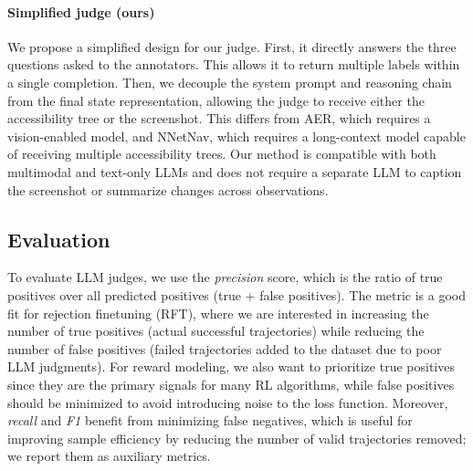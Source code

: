 \documentclass{article} %
\begin{document}
\paragraph{Simplified judge (ours)}
\label{sec:multi_reward_judge}
We propose a simplified design for our judge. First, it directly answers the three questions asked to the annotators. This allows it to return multiple labels within a single completion. Then, we decouple the system prompt and reasoning chain from the final state representation, allowing the judge to receive either the accessibility tree or the screenshot. This differs from AER, which requires a vision-enabled model, and NNetNav, which requires a long-context model capable of receiving multiple accessibility trees.
Our method is compatible with both multimodal and text-only LLMs and does not require a separate LLM to caption the screenshot or summarize changes across observations.




\subsection{Evaluation}
\label{sec:metrics}
To evaluate LLM judges, we use the \textit{precision} score, which is the ratio of true positives over all predicted positives (true + false positives).
The metric is a good fit for rejection finetuning (RFT), where we are interested in increasing the number of true positives (actual successful trajectories) while reducing the number of false positives (failed trajectories added to the dataset due to poor LLM judgments). For reward modeling, we also want to prioritize true positives since they are the primary signals for many RL algorithms, while false positives should be minimized to avoid introducing noise to the loss function. Moreover, \textit{recall} and \textit{F1} benefit from minimizing false negatives, which is useful for improving sample efficiency by reducing the number of valid trajectories removed; we report them as auxiliary metrics.
\end{document}
